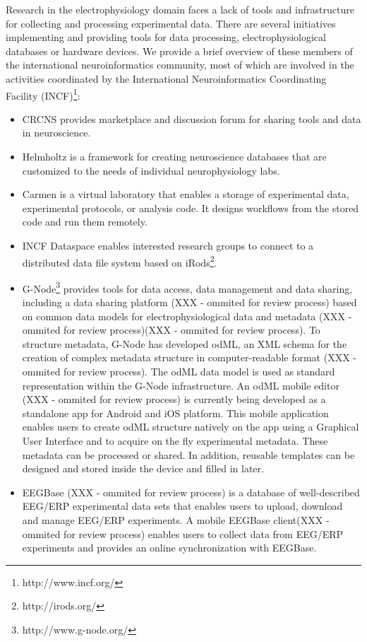 \documentclass[a4paper,twoside]{article}
\begin{document}
Research in the electrophysiology domain faces a lack of tools and infrastructure for collecting and processing experimental data. There are several initiatives implementing and providing tools for data processing, electrophysiological databases or hardware devices. We provide a brief overview of these members of the international neuroinformatics community, most of which are involved in the activities coordinated by the International Neuroinformatics Coordinating Facility (INCF)\footnote{http://www.incf.org/}:

\begin{itemize}

\item	CRCNS \cite{CRCNS} provides marketplace and discussion forum for sharing tools and data in neuroscience.
\item	Helmholtz \cite{10.3389/conf.fninf.2013.09.00025} is a framework for creating neuroscience databases that are customized to the needs of individual neurophysiology labs.
\item	Carmen \cite{fgibson:Watson2007} is a virtual laboratory that enables a storage of experimental data, experimental protocols, or analysis code. It designs workflows from the stored code and run them remotely.
\item	INCF Dataspace \cite{dataspace} enables interested research groups to connect to a distributed data file system based on iRods\footnote{http://irods.org/}.
\item	G-Node\footnote{http://www.g-node.org/} provides tools for data access, data management and data sharing, including a data sharing platform (XXX - ommited for review process) based on common data models for electrophysiological data and metadata (XXX - ommited for review process)(XXX - ommited for review process). To structure metadata, G-Node has developed odML, an XML schema for the creation of complex metadata structure in computer-readable format (XXX - ommited for review process). The odML data model is used as standard representation within the G-Node infrastructure. An odML mobile editor (XXX - ommited for review process) is currently being developed as a standalone app for Android and iOS platform. This mobile application enables users to create odML structure natively on the app using a Graphical User Interface and to acquire on the fly experimental metadata. These metadata can be processed or shared. In addition, reusable templates can be designed and stored inside the device and filled in later.
\item	EEGBase (XXX - ommited for review process) is a database of well-described EEG/ERP experimental data sets that enables users to upload, download and manage EEG/ERP experiments. A mobile EEGBase client(XXX - ommited for review process) enables users to collect data from EEG/ERP experiments and provides an online synchronization with EEGBase.



\end{itemize}
\end{document}
